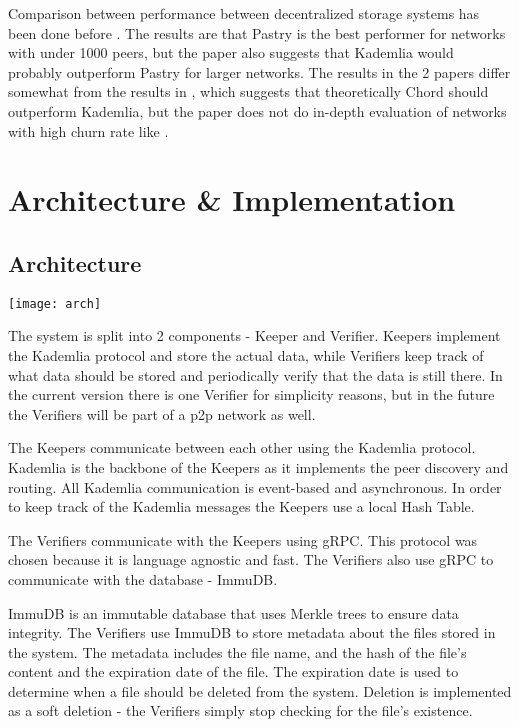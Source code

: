 \documentclass[ twoside,openright,titlepage,numbers=noenddot,headinclude,%
                footinclude=true,cleardoublepage=empty,abstractoff, %
                BCOR=5mm,paper=a4,fontsize=11pt,%
                ngerman,american,%
                ]{scrreprt}
\begin{document}
Comparison between performance between decentralized storage systems has been done before
\cite{kadvschordvspastry, 2019AIPC.2129b0131A}.
The results are that Pastry is the best performer for networks with under 1000 peers, but the paper also suggests
that Kademlia would probably outperform Pastry for larger networks.
The results in the 2 papers differ somewhat from the results in \cite{compstudy}, which suggests that theoretically
Chord should outperform Kademlia, but the paper does not do in-depth evaluation of networks with high churn rate
like \cite{kadvschordvspastry}.

\chapter{Architecture \& Implementation}
\label{cha:arch-impl}

\section{Architecture}
\label{sec:architecture}

\texttt{[image: arch]}

The system is split into 2 components - Keeper and Verifier.
Keepers implement the Kademlia protocol and store the actual data,
while Verifiers keep track of what data should be stored and periodically verify that the data is still there.
In the current version there is one Verifier for simplicity reasons,
but in the future the Verifiers will be part of a p2p network as well.

The Keepers communicate between each other using the Kademlia protocol.
Kademlia is the backbone of the Keepers as it implements the peer discovery and routing.
All Kademlia communication is event-based and asynchronous.
In order to keep track of the Kademlia messages the Keepers use a local Hash Table.

The Verifiers communicate with the Keepers using gRPC.
This protocol was chosen because it is language agnostic and fast.
The Verifiers also use gRPC to communicate with the database - ImmuDB.

ImmuDB is an immutable database that uses Merkle trees to ensure data integrity.
The Verifiers use ImmuDB to store metadata about the files stored in the system.
The metadata includes the file name, and the hash of the file's content and the expiration date of the file.
The expiration date is used to determine when a file should be deleted from the system.
Deletion is implemented as a soft deletion - the Verifiers simply stop checking for the file's existence.
\end{document}
